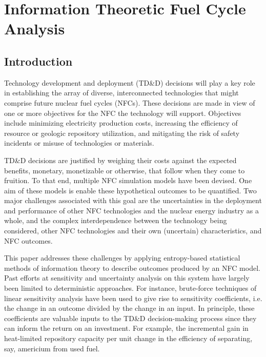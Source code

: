 \chapter{Information Theoretic Fuel Cycle Analysis}
\label{cts_paper}



\section{Introduction}
\label{cts_sec:intro}

Technology development and deployment (TD\&D) decisions will play a key role in
establishing the array of diverse, interconnected technologies that might comprise
future nuclear fuel cycles (NFCs).  These decisions are made in view of one or more
objectives for the NFC the technology will support.  Objectives include minimizing
electricity production costs, increasing the efficiency of resource or geologic
repository utilization, and mitigating the risk of safety incidents or misuse of
technologies or materials.

TD\&D decisions are justified by weighing their costs against the expected benefits,
monetary, monetizable or otherwise, that follow when they come to fruition.  To that
end, multiple NFC simulation models  \cite{Jacobson2009} \cite{GENIUS1} have been devised.  
One aim of these models is enable these hypothetical outcomes to be quantified.  Two major 
challenges associated with this goal are the uncertainties in the deployment and performance 
of other NFC technologies and the nuclear energy industry as a whole, and the complex 
interdependence between the technology being considered, other NFC technologies and their 
own (uncertain) characteristics, and NFC outcomes.

This paper addresses these challenges by applying entropy-based statistical methods of information
theory to describe outcomes produced by an NFC model.  Past efforts at sensitivity and uncertainty
analysis on this system have largely been limited to deterministic approaches.  For instance,
brute-force techniques of linear sensitivity analysis have been used to give rise to sensitivity
coefficients, i.e. the change in an outcome divided by the change in an input.  In principle, these
coefficients are valuable inputs to the TD\&D decision-making process since they can inform the
return on an investment.  For example, the incremental gain in heat-limited repository capacity per
unit change in the efficiency of separating, say, americium from used fuel.

